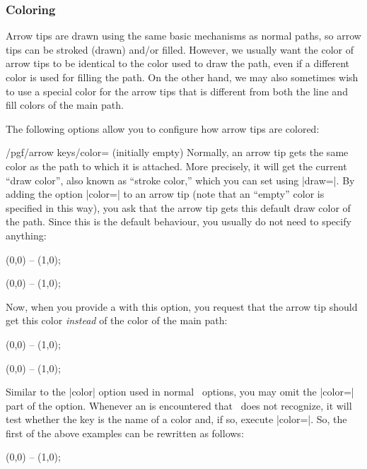 \subsubsection{Coloring}

Arrow tips are drawn using the same basic mechanisms as normal paths,
so arrow tips can be stroked (drawn) and/or filled. However, we
usually want the color of arrow tips to be identical to the color used
to draw the path, even if a different color is used for filling the
path. On the other hand, we may also sometimes wish to use a special
color for the arrow tips that is different from both the line and fill
colors of the main path.

The following options allow you to configure how arrow tips are
colored:

\begin{key}{/pgf/arrow keys/color= (initially
    \normalfont empty)}
  Normally, an arrow tip gets the same color as the path to which it
  is attached. More precisely, it will get the current ``draw color'',
  also known as ``stroke color,'' which you can set using
  |draw=|. By adding the option |color=| to an arrow
  tip (note that an ``empty'' color is specified in this way), you ask
  that the arrow tip gets this default draw color of the path. Since
  this is the default behaviour, you usually do not need to specify
  anything: 
\begin{codeexample}[width=3cm]
 \draw [red, arrows = {-Stealth}] (0,0) -- (1,0);
\end{codeexample}
\begin{codeexample}[width=3cm]
 \draw [blue, arrows = {-Stealth}] (0,0) -- (1,0);
\end{codeexample}

  Now, when you provide a  with this option, you request
  that the arrow tip should get this color \emph{instead} of the color
  of the main path:
\begin{codeexample}[width=3cm]
 \draw [red, arrows = {-Stealth[color=blue]}] (0,0) -- (1,0);
\end{codeexample}
\begin{codeexample}[width=3cm]
 \draw [red, arrows = {-Stealth[color=black]}] (0,0) -- (1,0);
\end{codeexample}

  Similar to the |color| option used in normal \tikzname\ options, you
  may omit the |color=| part of the option. Whenever an 
  is  encountered that \tikzname\ does not recognize, it will test whether
  the key is the name of a color and, if so, execute
  |color=|. So, the first of the above examples can be
  rewritten as follows:
\begin{codeexample}[width=3cm]
 \draw [red, arrows = {-Stealth[blue]}] (0,0) -- (1,0);
\end{codeexample}


\end{key}
